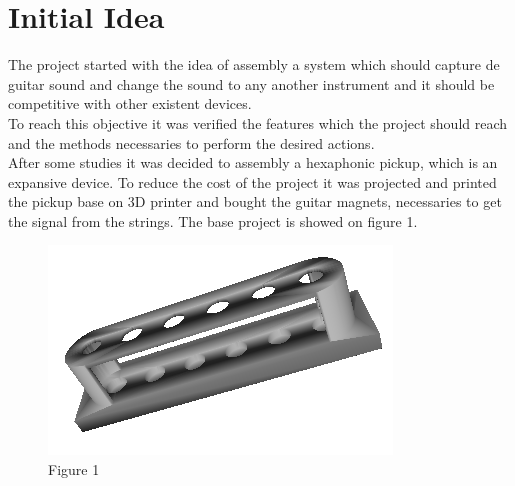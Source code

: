 \chapter{Initial Idea}
The project started with the idea of assembly a system which should capture de guitar sound and change the sound to any another instrument and it should be competitive with other existent devices.\\
To reach this objective it was verified the features which the project should reach and the methods necessaries to perform the desired actions.\\
After some studies it was decided to assembly a hexaphonic pickup, which is an expansive device. To reduce the cost of the project it was projected and printed the pickup base on 3D printer and bought the guitar magnets, necessaries to get the signal from the strings. The base project is showed on figure 1.
\begin{figure}[!htpb]
\includegraphics[scale=1]{Capt}
\caption{Figure 1}
\end{figure}
